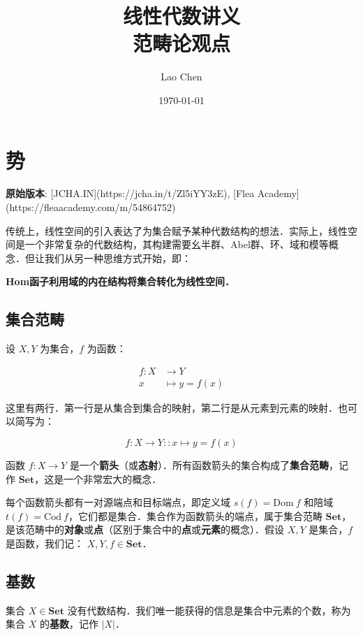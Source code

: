 \documentclass[10pt, openany]{book}
\begin{document}
\frontmatter
\title{\textbf{线性代数讲义}\\ \large 范畴论观点}
\author{Lao Chen}
\date{\today}
\maketitle
\tableofcontents

\mainmatter

\chapter{势}

\textbf{原始版本}: [JCHA.IN](https://jcha.in/t/Zl5iYY3zE), [Flea Academy](https://fleaacademy.com/m/54864752)

传统上，线性空间的引入表达了为集合赋予某种代数结构的想法．实际上，线性空间是一个非常复杂的代数结构，其构建需要幺半群、Abel群、环、域和模等概念．但让我们从另一种思维方式开始，即：

\textbf{Hom函子利用域的内在结构将集合转化为线性空间．}

\section{集合范畴}

设 $X,Y$ 为集合，$f$ 为函数：

$$
\begin{aligned}
f: X &\to Y \\
x &\mapsto y = f(x)
\end{aligned}
$$

这里有两行．第一行是从集合到集合的映射，第二行是从元素到元素的映射．也可以简写为：

$$
f: X \to Y :: x \mapsto y = f(x)
$$

函数 $f: X \to Y$ 是一个\textbf{箭头}（或\textbf{态射}）．所有函数箭头的集合构成了\textbf{集合范畴}，记作 $\textbf{Set}$，这是一个非常宏大的概念．

每个函数箭头都有一对源端点和目标端点，即定义域 $s(f) = \text{Dom}\ f$ 和陪域 $t(f) = \text{Cod} \ f$，它们都是集合．集合作为函数箭头的端点，属于集合范畴 $\textbf{Set}$，是该范畴中的\textbf{对象}或\textbf{点}（区别于集合中的\textbf{点}或\textbf{元素}的概念）．假设 $X,Y$ 是集合，$f$ 是函数，我们记：
$X,Y,f\in\textbf{Set}$．

\section{基数}

集合 $X\in\textbf{Set}$ 没有代数结构．我们唯一能获得的信息是集合中元素的个数，称为集合 $X$ 的\textbf{基数}，记作 $|X|$．
\end{document}
